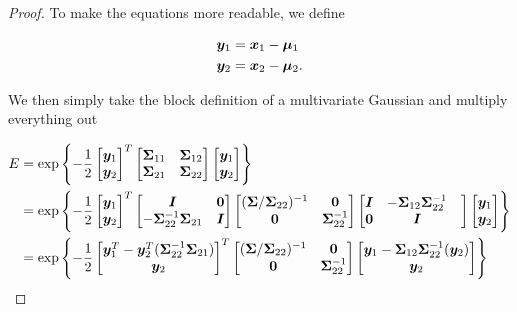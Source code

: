 \begin{proof}
    To make the equations more readable, we define

    \begin{align}
        {\bm{y}}_1 &= {\bm{x}}_1 - {\bm{\mu}}_1 \\
        {\bm{y}}_2 &= {\bm{x}}_2 - {\bm{\mu}}_2.
    \end{align}

    We then simply take the block definition of a multivariate Gaussian and
    multiply everything out

    \begin{align}
        E &= \exp \left\lbrace -\frac{1}{2}
        \begin{bmatrix} \vy_1 \\ \vy_2 \end{bmatrix}^T
        \partsigma
        \begin{bmatrix} \vy_1 \\ \vy_2 \end{bmatrix} \right\rbrace \\
        &= \exp \left\lbrace -\frac{1}{2}
        \begin{bmatrix} \vy_1 \\ \vy_2 \end{bmatrix}^T
        \begin{bmatrix} \mI & \mZero \\ -\mSigma_{22}^{-1} \mSigma_{21} & \mI \end{bmatrix}
        \begin{bmatrix} (\mSigma/\mSigma_{22})^{-1} & \mZero \\ \mZero & \mSigma_{22}^{-1} \end{bmatrix}
        \begin{bmatrix} \mI & -\mSigma_{12} \mSigma_{22}^{-1} & \\ \mZero & \mI \end{bmatrix}
        \begin{bmatrix} \vy_1 \\ \vy_2 \end{bmatrix} \right\rbrace \\
        &= \exp \left\lbrace -\frac{1}{2}
        \begin{bmatrix} \vy_1^T - \vy_2^T (\mSigma_{22}^{-1} \mSigma_{21}) \\
        \vy_2
        \end{bmatrix}^T
        \begin{bmatrix} (\mSigma/\mSigma_{22})^{-1} & \mZero \\ \mZero & \mSigma_{22}^{-1} \end{bmatrix} \begin{bmatrix} \vy_1 -\mSigma_{12} \mSigma_{22}^{-1} (\vy_2) \\ \vy_2 \end{bmatrix} \right\rbrace \\

\end{align}
\end{proof}
